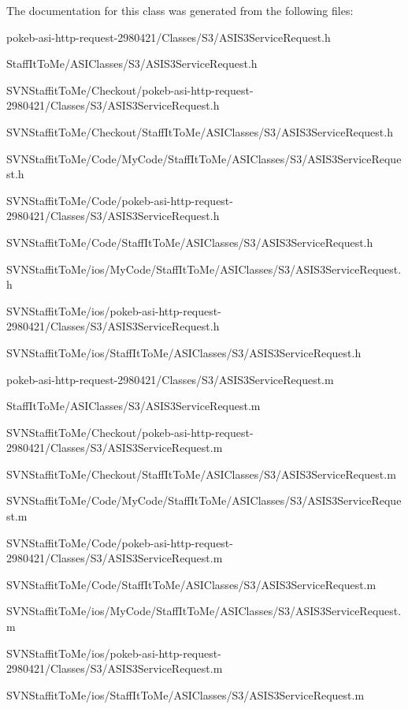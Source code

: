 \-The documentation for this class was generated from the following files\-:\begin{DoxyCompactItemize}
\item 
pokeb-\/asi-\/http-\/request-\/2980421/\-Classes/\-S3/\-A\-S\-I\-S3\-Service\-Request.\-h\item 
\-Staff\-It\-To\-Me/\-A\-S\-I\-Classes/\-S3/\-A\-S\-I\-S3\-Service\-Request.\-h\item 
\-S\-V\-N\-Staffit\-To\-Me/\-Checkout/pokeb-\/asi-\/http-\/request-\/2980421/\-Classes/\-S3/\-A\-S\-I\-S3\-Service\-Request.\-h\item 
\-S\-V\-N\-Staffit\-To\-Me/\-Checkout/\-Staff\-It\-To\-Me/\-A\-S\-I\-Classes/\-S3/\-A\-S\-I\-S3\-Service\-Request.\-h\item 
\-S\-V\-N\-Staffit\-To\-Me/\-Code/\-My\-Code/\-Staff\-It\-To\-Me/\-A\-S\-I\-Classes/\-S3/\-A\-S\-I\-S3\-Service\-Request.\-h\item 
\-S\-V\-N\-Staffit\-To\-Me/\-Code/pokeb-\/asi-\/http-\/request-\/2980421/\-Classes/\-S3/\-A\-S\-I\-S3\-Service\-Request.\-h\item 
\-S\-V\-N\-Staffit\-To\-Me/\-Code/\-Staff\-It\-To\-Me/\-A\-S\-I\-Classes/\-S3/\-A\-S\-I\-S3\-Service\-Request.\-h\item 
\-S\-V\-N\-Staffit\-To\-Me/ios/\-My\-Code/\-Staff\-It\-To\-Me/\-A\-S\-I\-Classes/\-S3/\-A\-S\-I\-S3\-Service\-Request.\-h\item 
\-S\-V\-N\-Staffit\-To\-Me/ios/pokeb-\/asi-\/http-\/request-\/2980421/\-Classes/\-S3/\-A\-S\-I\-S3\-Service\-Request.\-h\item 
\-S\-V\-N\-Staffit\-To\-Me/ios/\-Staff\-It\-To\-Me/\-A\-S\-I\-Classes/\-S3/\-A\-S\-I\-S3\-Service\-Request.\-h\item 
pokeb-\/asi-\/http-\/request-\/2980421/\-Classes/\-S3/\-A\-S\-I\-S3\-Service\-Request.\-m\item 
\-Staff\-It\-To\-Me/\-A\-S\-I\-Classes/\-S3/\-A\-S\-I\-S3\-Service\-Request.\-m\item 
\-S\-V\-N\-Staffit\-To\-Me/\-Checkout/pokeb-\/asi-\/http-\/request-\/2980421/\-Classes/\-S3/\-A\-S\-I\-S3\-Service\-Request.\-m\item 
\-S\-V\-N\-Staffit\-To\-Me/\-Checkout/\-Staff\-It\-To\-Me/\-A\-S\-I\-Classes/\-S3/\-A\-S\-I\-S3\-Service\-Request.\-m\item 
\-S\-V\-N\-Staffit\-To\-Me/\-Code/\-My\-Code/\-Staff\-It\-To\-Me/\-A\-S\-I\-Classes/\-S3/\-A\-S\-I\-S3\-Service\-Request.\-m\item 
\-S\-V\-N\-Staffit\-To\-Me/\-Code/pokeb-\/asi-\/http-\/request-\/2980421/\-Classes/\-S3/\-A\-S\-I\-S3\-Service\-Request.\-m\item 
\-S\-V\-N\-Staffit\-To\-Me/\-Code/\-Staff\-It\-To\-Me/\-A\-S\-I\-Classes/\-S3/\-A\-S\-I\-S3\-Service\-Request.\-m\item 
\-S\-V\-N\-Staffit\-To\-Me/ios/\-My\-Code/\-Staff\-It\-To\-Me/\-A\-S\-I\-Classes/\-S3/\-A\-S\-I\-S3\-Service\-Request.\-m\item 
\-S\-V\-N\-Staffit\-To\-Me/ios/pokeb-\/asi-\/http-\/request-\/2980421/\-Classes/\-S3/\-A\-S\-I\-S3\-Service\-Request.\-m\item 
\-S\-V\-N\-Staffit\-To\-Me/ios/\-Staff\-It\-To\-Me/\-A\-S\-I\-Classes/\-S3/\-A\-S\-I\-S3\-Service\-Request.\-m\end{DoxyCompactItemize}
